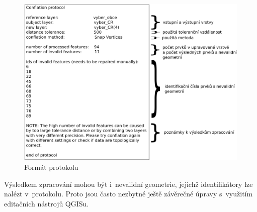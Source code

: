 \label{protokol}
  \begin{figure}[hbt]
    \centering
      \includegraphics{./pictures/protokol.pdf}
      \caption{Formát protokolu}
      \label{fig:protokol}
  \end{figure} 

Výsledkem zpracování mohou být i~nevalidní geometrie, jejichž identifikátory lze
nalézt v~protokolu. Proto jsou často nezbytné ještě závěrečné úpravy s~využitím
editačních nástrojů QGISu. 

